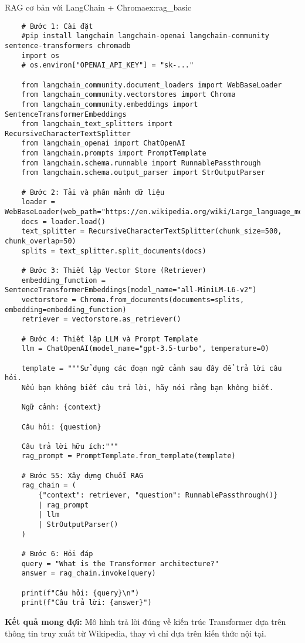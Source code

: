 \begin{example}{RAG cơ bản với LangChain + Chroma}{ex:rag_basic}
    \begin{verbatim}
    # Bước 1: Cài đặt
    #pip install langchain langchain-openai langchain-community sentence-transformers chromadb
    import os
    # os.environ["OPENAI_API_KEY"] = "sk-..."
    
    from langchain_community.document_loaders import WebBaseLoader
    from langchain_community.vectorstores import Chroma
    from langchain_community.embeddings import SentenceTransformerEmbeddings
    from langchain_text_splitters import RecursiveCharacterTextSplitter
    from langchain_openai import ChatOpenAI
    from langchain.prompts import PromptTemplate
    from langchain.schema.runnable import RunnablePassthrough
    from langchain.schema.output_parser import StrOutputParser
    
    # Bước 2: Tải và phân mảnh dữ liệu
    loader = WebBaseLoader(web_path="https://en.wikipedia.org/wiki/Large_language_model")
    docs = loader.load()
    text_splitter = RecursiveCharacterTextSplitter(chunk_size=500, chunk_overlap=50)
    splits = text_splitter.split_documents(docs)
    
    # Bước 3: Thiết lập Vector Store (Retriever)
    embedding_function = SentenceTransformerEmbeddings(model_name="all-MiniLM-L6-v2")
    vectorstore = Chroma.from_documents(documents=splits, embedding=embedding_function)
    retriever = vectorstore.as_retriever()
    
    # Bước 4: Thiết lập LLM và Prompt Template
    llm = ChatOpenAI(model_name="gpt-3.5-turbo", temperature=0)
    
    template = """Sử dụng các đoạn ngữ cảnh sau đây để trả lời câu hỏi.
    Nếu bạn không biết câu trả lời, hãy nói rằng bạn không biết.
    
    Ngữ cảnh: {context}
    
    Câu hỏi: {question}
    
    Câu trả lời hữu ích:"""
    rag_prompt = PromptTemplate.from_template(template)
    
    # Bước 55: Xây dựng Chuỗi RAG
    rag_chain = (
        {"context": retriever, "question": RunnablePassthrough()}
        | rag_prompt
        | llm
        | StrOutputParser()
    )
    
    # Bước 6: Hỏi đáp
    query = "What is the Transformer architecture?"
    answer = rag_chain.invoke(query)
    
    print(f"Câu hỏi: {query}\n")
    print(f"Câu trả lời: {answer}")
    \end{verbatim}
\end{example}

\textbf{Kết quả mong đợi:} Mô hình trả lời đúng về kiến trúc Transformer dựa trên thông tin truy xuất từ Wikipedia, thay vì chỉ dựa trên kiến thức nội tại.
